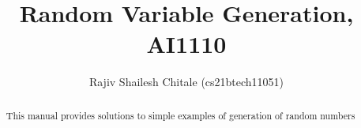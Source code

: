 \documentclass[journal,12pt,twocolumn]{IEEEtran}
\begin{document}
\let\StandardTheFigure\thefigure
\let\vec\mathbf

\def\putbox#1#2#3{\makebox[0in][l]{\makebox[#1][l]{}\raisebox{\baselineskip}[0in][0in]{\raisebox{#2}[0in][0in]{#3}}}}
     \def\rightbox#1{\makebox[0in][r]{#1}}
     \def\centbox#1{\makebox[0in]{#1}}
     \def\topbox#1{\raisebox{-\baselineskip}[0in][0in]{#1}}
     \def\midbox#1{\raisebox{-0.5\baselineskip}[0in][0in]{#1}}
\vspace{3cm}

\title{Random Variable Generation, AI1110}
\author{Rajiv Shailesh Chitale (cs21btech11051)}	

\maketitle
\tableofcontents
\bigskip
\renewcommand{\thefigure}{\theenumi}
\renewcommand{\thetable}{\theenumi}


\begin{abstract}
This manual provides solutions to simple examples of generation of random numbers
\end{abstract}
\end{document}
